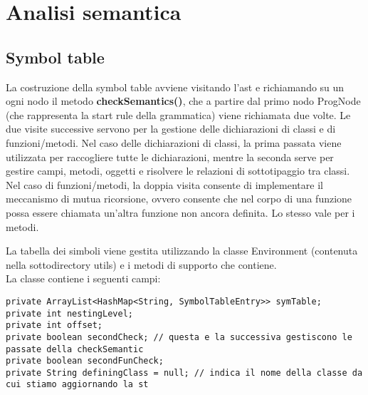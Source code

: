 \documentclass[a4paper]{article}   %
\begin{document}
\section{Analisi semantica}
\subsection{Symbol table}

La costruzione della symbol table avviene visitando l'ast e richiamando su un ogni nodo il metodo \textbf{checkSemantics()},
che a partire dal primo nodo ProgNode (che rappresenta la start rule della grammatica) viene richiamata due volte.
Le due visite successive servono per la gestione delle dichiarazioni di classi e di funzioni/metodi.
Nel caso delle dichiarazioni di classi, la prima passata viene utilizzata per raccogliere tutte le dichiarazioni, mentre la seconda
serve per gestire campi, metodi, oggetti e risolvere le relazioni di sottotipaggio tra classi.
Nel caso di funzioni/metodi, la doppia visita consente di implementare il meccanismo di mutua ricorsione, ovvero consente
che nel corpo di una funzione possa essere chiamata un'altra funzione non ancora definita. Lo stesso vale per i metodi.

La tabella dei simboli viene gestita utilizzando la classe Environment (contenuta nella sottodirectory utils)
e i metodi di supporto che contiene.\\
La classe contiene i seguenti campi:\\

\begin{lstlisting}
private ArrayList<HashMap<String, SymbolTableEntry>> symTable;
private int nestingLevel;
private int offset;
private boolean secondCheck; // questa e la successiva gestiscono le passate della checkSemantic
private boolean secondFunCheck;
private String definingClass = null; // indica il nome della classe da cui stiamo aggiornando la st
\end{lstlisting}
\end{document}
